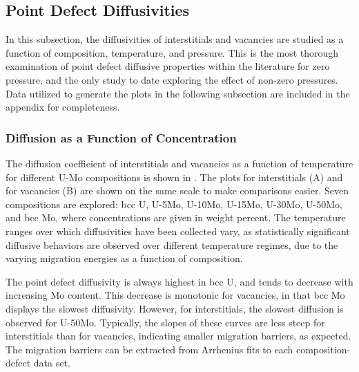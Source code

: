 \documentclass[review]{elsarticle}
\begin{document}

\subsection{Point Defect Diffusivities}

In this subsection, the diffusivities of interstitials and vacancies are studied as a function of composition, temperature, and pressure. This is the most thorough examination of point defect diffusive properties within the literature for zero pressure, and the only study to date exploring the effect of non-zero pressures. Data utilized to generate the plots in the following subsection are included in the appendix for completeness.

\subsubsection{Diffusion as a Function of Concentration}

The diffusion coefficient of interstitials and vacancies as a function of temperature for different U-Mo compositions is shown in . The plots for interstitials (A) and for vacancies (B) are shown on the same scale to make comparisons easier. Seven compositions are explored: bcc U, U-5Mo, U-10Mo, U-15Mo, U-30Mo, U-50Mo, and bcc Mo, where concentrations are given in weight percent. The temperature ranges over which diffusivities have been collected vary, as statistically significant diffusive behaviors are observed over different temperature regimes, due to the varying migration energies as a function of composition. 

The point defect diffusivity is always highest in bcc U, and tends to decrease with increasing Mo content. This decrease is monotonic for vacancies, in that bcc Mo displays the slowest diffusivity. However, for interstitials, the slowest diffusion is observed for U-50Mo. Typically, the slopes of these curves are less steep for interstitials than for vacancies, indicating smaller migration barriers, as expected. The migration barriers can be extracted from Arrhenius fits to each composition-defect data set. 
\end{document}
